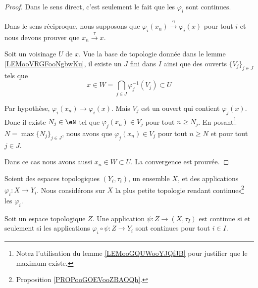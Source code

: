 \begin{proof}
	Dans le sens direct, c'est seulement le fait que les \( \varphi_i\) sont continues.

	Dans le sens réciproque, nous supposons que \( \varphi_i(x_n)\stackrel{\tau_i}{\longrightarrow}\varphi_i(x)\) pour tout \( i\) et nous devons prouver que \( x_n\stackrel{\tau}{\longrightarrow}x\).

	Soit un voisinage \( U\) de \( x\). Vue la base de topologie donnée dans le lemme \ref{LEMooVRGFooNgbwKu}, il existe un \( J\) fini dans \( I\) ainsi que des ouverts \( \{ V_j \}_{j\in J}\) tels que
	\begin{equation}
		x\in W=\bigcap_{j\in J}\varphi_j^{-1}(V_j)\subset U
	\end{equation}

	Par hypothèse, \( \varphi_i(x_n)\to\varphi_i(x)\). Mais \( V_j\) est un ouvert qui contient \( \varphi_j(x)\). Donc il existe \( N_j\in \eN\) tel que \( \varphi_j(x_n)\in V_j\) pour tout \( n\geq N_j\). En posant\footnote{Notez l'utilisation du lemme \ref{LEMooGQUWooYJQfJB} pour justifier que le maximum existe.} \( N=\max\{ N_j \}_{j\in J}\), nous avons que \( \varphi_j(x_n)\in V_j\) pour tout \( n\geq N\) et pour tout \( j\in J\).

	Dans ce cas nous avons aussi \( x_n\in W\subset U\). La convergence est prouvée.
\end{proof}

\begin{proposition}		\label{PROPooCBPEooCuaLUk}
	Soient des espaces topologiques \( (Y_i,\tau_i)\), un ensemble \( X\), et des applications \( \varphi_i\colon X\to Y_i\). Nous considérons sur \( X\) la plus petite topologie rendant continues\footnote{Proposition \ref{PROPooGOEVooZBAOQh}.} les \( \varphi_i\).

	Soit un espace topologique \( Z\). Une application \( \psi\colon Z\to (X,\tau_I)\) est continue si et seulement si les applications \( \varphi_i\circ\psi\colon Z\to Y_i\) sont continues pour tout \( i\in I\).
\end{proposition}


